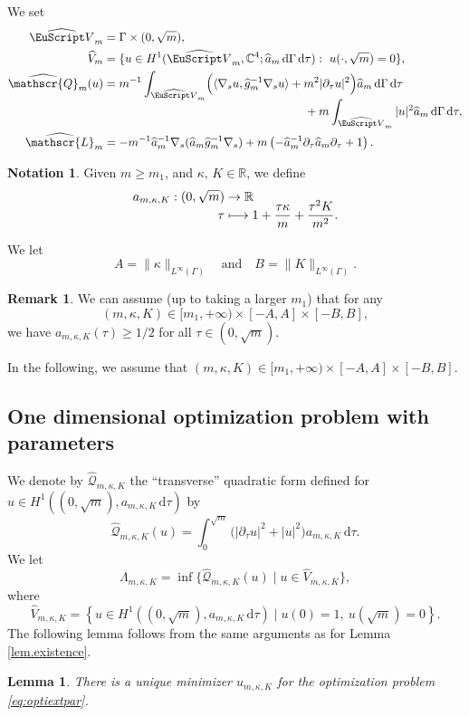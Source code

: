 \documentclass[JEP,XML,SOM,Unicode]{cedram}
\let\mathcal \EuScript
\newcommand\mto{\mathchoice{\longmapsto}{\mapsto}{\mapsto}{\mapsto}}
\newcommand{\scrL}{\mathscr{L}}
\newcommand{\scrQ}{\mathscr{Q}}
\let\sep\mid
\theoremstyle{plain}
\newtheorem{lemma}[theorem]{Lemma}
\theoremstyle{definition}
\newtheorem{notation}[theorem]{Notation}
\newtheorem{remark}[theorem]{Remark}
\newcommand{\RR}{\mathbb{R}}
\newcommand{\CC}{\mathbb{C}}
\newcommand{\dx}{\mathrm{\,d}}
\begin{document}
We set
\begin{equation}\label{eq:dom-hat}
\begin{split}
\widehat{\mathcal V}_{m}&=\Gamma\times(0,\sqrt{m}),\\
\widehat V_{m}&=\{u\in H^1(\widehat{\mathcal V}_{m}, \CC^4;\widehat a_m \dx \Gamma \dx\tau):~u(\cdot,\sqrt{m})=0\},\\
\widehat{\scrQ}_{m}(u)&=m^{-1}\int_{\widehat{\mathcal V}_{m}}\Bigl(\langle\nabla_{s} u,\widehat g^{-1}_m\nabla_{s} u\rangle+m^2|\partial_\tau u|^2\Bigr)\widehat a_m \dx \Gamma \dx\tau\\[-5pt]
&\hspace*{6cm}+m\int_{\widehat{\mathcal V}_{m}}|u|^2\widehat{a}_m\dx \Gamma\dx \tau,\\
\widehat{\scrL}_m&=-m^{-1} \widehat a^{-1}_m\nabla_s(\widehat a_m \widehat g^{-1}_m\nabla_s)
+m\left(-\widehat a^{-1}_m\partial_\tau\widehat a_m\partial_\tau
+1\right).
\end{split}
\end{equation}
\begin{notation}\label{notnation curvatures}
Given $m\geq m_1$, and
$\kappa,\, K\in\RR$, we define
\begin{align*}
a_{m,\kappa,K} : (0,\sqrt{m})& \to \RR \\[-8pt]
\tau&\mto1 + \frac{\tau\kappa}{m} + \frac{\tau^2K}{m^2}.
\end{align*}
\end{notation}
We let
\begin{equation}\label{eq:bcur}
A =\|\kappa\|_{L^\infty(\Gamma)} \quad\text{and}\quad  B = \|K\|_{L^\infty(\Gamma)}.
\end{equation}
\begin{remark}\label{rem:m0}
We can assume (up to taking a larger $m_1$) that for any
\[
(m,\kappa,K)\in[m_1,+\infty)\times[-A,A]\times [-B,B],
\]
we have
$
a_{m,\kappa,K}(\tau)\geq 1/2
$
for all $\tau\in(0,\sqrt{m})$.
\end{remark}
In the following, we assume that $(m,\kappa,K)\in[m_1,+\infty)\times[-A,A]\times [-B,B]$.

\subsection{One dimensional optimization problem with parameters}
We denote by $\widehat{\scrQ}_{m,\kappa,K}$ the \enquote{transverse} quadratic form defined for $u\in H^1((0,\sqrt{m}), a_{m,\kappa,K}\dx\tau)$ by
\[
\widehat{\scrQ}_{m,\kappa,K}(u)
= \int_{0}^{\sqrt{m}}
\big(|\partial_\tau u|^2 + |u|^2\big)a_{m,\kappa,K} \dx\tau.
\]
We let
\begin{equation}\label{eq:optiextpar}
\Lambda_{m,\kappa,K} = \inf\{
\widehat{\scrQ}_{m,\kappa,K}(u) \sep u\in \widehat{V}_{m,\kappa,K}
\},
\end{equation}
where
\[
\widehat{V}_{m,\kappa,K} = \left\{
u \in H^1((0,\sqrt{m}), a_{m,\kappa,K}\dx\tau)\sep u(0) = 1, \ u(\sqrt{m})=0
\right\}.
\]
The following lemma follows from the same arguments as for Lemma \ref{lem.existence}.
\begin{lemma}\label{unique minim 1d}
There is a unique minimizer $u_{m,\kappa,K}$ for the optimization problem \eqref{eq:optiextpar}.
\end{lemma}
\end{document}
